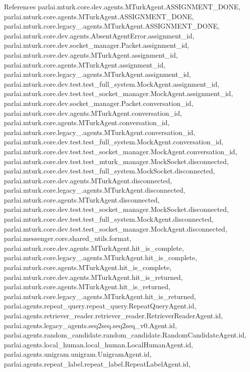 References parlai.\+mturk.\+core.\+dev.\+agents.\+M\+Turk\+Agent.\+A\+S\+S\+I\+G\+N\+M\+E\+N\+T\+\_\+\+D\+O\+NE, parlai.\+mturk.\+core.\+agents.\+M\+Turk\+Agent.\+A\+S\+S\+I\+G\+N\+M\+E\+N\+T\+\_\+\+D\+O\+NE, parlai.\+mturk.\+core.\+legacy\+\_.\+agents.\+M\+Turk\+Agent.\+A\+S\+S\+I\+G\+N\+M\+E\+N\+T\+\_\+\+D\+O\+NE, parlai.\+mturk.\+core.\+dev.\+agents.\+Absent\+Agent\+Error.\+assignment\+\_\+id, parlai.\+mturk.\+core.\+dev.\+socket\+\_\+manager.\+Packet.\+assignment\+\_\+id, parlai.\+mturk.\+core.\+dev.\+agents.\+M\+Turk\+Agent.\+assignment\+\_\+id, parlai.\+mturk.\+core.\+agents.\+M\+Turk\+Agent.\+assignment\+\_\+id, parlai.\+mturk.\+core.\+legacy\+\_.\+agents.\+M\+Turk\+Agent.\+assignment\+\_\+id, parlai.\+mturk.\+core.\+dev.\+test.\+test\+\_\+full\+\_\+system.\+Mock\+Agent.\+assignment\+\_\+id, parlai.\+mturk.\+core.\+dev.\+test.\+test\+\_\+socket\+\_\+manager.\+Mock\+Agent.\+assignment\+\_\+id, parlai.\+mturk.\+core.\+dev.\+socket\+\_\+manager.\+Packet.\+conversation\+\_\+id, parlai.\+mturk.\+core.\+dev.\+agents.\+M\+Turk\+Agent.\+conversation\+\_\+id, parlai.\+mturk.\+core.\+agents.\+M\+Turk\+Agent.\+conversation\+\_\+id, parlai.\+mturk.\+core.\+legacy\+\_.\+agents.\+M\+Turk\+Agent.\+conversation\+\_\+id, parlai.\+mturk.\+core.\+dev.\+test.\+test\+\_\+full\+\_\+system.\+Mock\+Agent.\+conversation\+\_\+id, parlai.\+mturk.\+core.\+dev.\+test.\+test\+\_\+socket\+\_\+manager.\+Mock\+Agent.\+conversation\+\_\+id, parlai.\+mturk.\+core.\+dev.\+test.\+test\+\_\+mturk\+\_\+manager.\+Mock\+Socket.\+disconnected, parlai.\+mturk.\+core.\+dev.\+test.\+test\+\_\+full\+\_\+system.\+Mock\+Socket.\+disconnected, parlai.\+mturk.\+core.\+dev.\+agents.\+M\+Turk\+Agent.\+disconnected, parlai.\+mturk.\+core.\+legacy\+\_.\+agents.\+M\+Turk\+Agent.\+disconnected, parlai.\+mturk.\+core.\+agents.\+M\+Turk\+Agent.\+disconnected, parlai.\+mturk.\+core.\+dev.\+test.\+test\+\_\+socket\+\_\+manager.\+Mock\+Socket.\+disconnected, parlai.\+mturk.\+core.\+dev.\+test.\+test\+\_\+full\+\_\+system.\+Mock\+Agent.\+disconnected, parlai.\+mturk.\+core.\+dev.\+test.\+test\+\_\+socket\+\_\+manager.\+Mock\+Agent.\+disconnected, parlai.\+messenger.\+core.\+shared\+\_\+utils.\+format, parlai.\+mturk.\+core.\+dev.\+agents.\+M\+Turk\+Agent.\+hit\+\_\+is\+\_\+complete, parlai.\+mturk.\+core.\+legacy\+\_.\+agents.\+M\+Turk\+Agent.\+hit\+\_\+is\+\_\+complete, parlai.\+mturk.\+core.\+agents.\+M\+Turk\+Agent.\+hit\+\_\+is\+\_\+complete, parlai.\+mturk.\+core.\+dev.\+agents.\+M\+Turk\+Agent.\+hit\+\_\+is\+\_\+returned, parlai.\+mturk.\+core.\+agents.\+M\+Turk\+Agent.\+hit\+\_\+is\+\_\+returned, parlai.\+mturk.\+core.\+legacy\+\_.\+agents.\+M\+Turk\+Agent.\+hit\+\_\+is\+\_\+returned, parlai.\+agents.\+repeat\+\_\+query.\+repeat\+\_\+query.\+Repeat\+Query\+Agent.\+id, parlai.\+agents.\+retriever\+\_\+reader.\+retriever\+\_\+reader.\+Retriever\+Reader\+Agent.\+id, parlai.\+agents.\+legacy\+\_\+agents.\+seq2seq.\+seq2seq\+\_\+v0.\+Agent.\+id, parlai.\+agents.\+random\+\_\+candidate.\+random\+\_\+candidate.\+Random\+Candidate\+Agent.\+id, parlai.\+agents.\+local\+\_\+human.\+local\+\_\+human.\+Local\+Human\+Agent.\+id, parlai.\+agents.\+unigram.\+unigram.\+Unigram\+Agent.\+id, parlai.\+agents.\+repeat\+\_\+label.\+repeat\+\_\+label.\+Repeat\+Label\+Agent.\+id, 